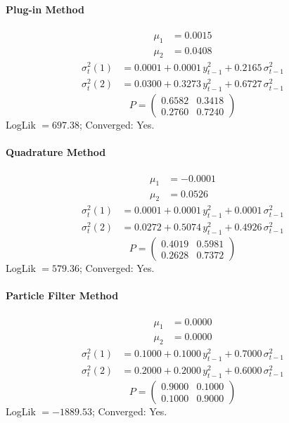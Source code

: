 \documentclass[11pt, a4paper]{article}
\begin{document}
\paragraph{Plug-in Method}
\begin{align}
\mu_{1} &= 0.0015 \\
\mu_{2} &= 0.0408
\end{align}
\begin{align}
\sigma^2_{t}(1) &= 0.0001 + 0.0001\, y_{t-1}^2 + 0.2165\, \sigma^2_{t-1} \\
\sigma^2_{t}(2) &= 0.0300 + 0.3273\, y_{t-1}^2 + 0.6727\, \sigma^2_{t-1}
\end{align}
\begin{equation}
P = \begin{pmatrix} 0.6582 & 0.3418 \\ 0.2760 & 0.7240 \end{pmatrix}
\end{equation}
LogLik $= 697.38$; Converged: Yes.

\paragraph{Quadrature Method}
\begin{align}
\mu_{1} &= -0.0001 \\
\mu_{2} &= 0.0526
\end{align}
\begin{align}
\sigma^2_{t}(1) &= 0.0001 + 0.0001\, y_{t-1}^2 + 0.0001\, \sigma^2_{t-1} \\
\sigma^2_{t}(2) &= 0.0272 + 0.5074\, y_{t-1}^2 + 0.4926\, \sigma^2_{t-1}
\end{align}
\begin{equation}
P = \begin{pmatrix} 0.4019 & 0.5981 \\ 0.2628 & 0.7372 \end{pmatrix}
\end{equation}
LogLik $= 579.36$; Converged: Yes.

\paragraph{Particle Filter Method}
\begin{align}
\mu_{1} &= 0.0000 \\
\mu_{2} &= 0.0000
\end{align}
\begin{align}
\sigma^2_{t}(1) &= 0.1000 + 0.1000\, y_{t-1}^2 + 0.7000\, \sigma^2_{t-1} \\
\sigma^2_{t}(2) &= 0.2000 + 0.2000\, y_{t-1}^2 + 0.6000\, \sigma^2_{t-1}
\end{align}
\begin{equation}
P = \begin{pmatrix} 0.9000 & 0.1000 \\ 0.1000 & 0.9000 \end{pmatrix}
\end{equation}
LogLik $= -1889.53$; Converged: Yes.
\end{document}
